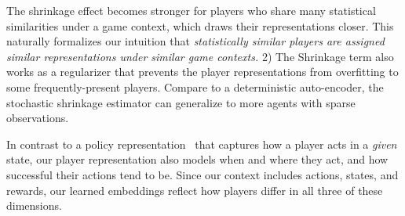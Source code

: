 \documentclass{article}
\newcommand{\latentvariables}{\mathbf{z}}
\newcommand{\state}{\mathbf{s}}
\newcommand{\action}{\mathbf{a}}
\newcommand{\reward}{\boldsymbol{r}}
\newcommand{\player}{pl}
\begin{document}
The shrinkage effect becomes stronger for players who share many statistical similarities under a game context, which %
draws their representations closer.
This naturally formalizes our intuition that {\em statistically similar players are assigned similar representations under similar game contexts.} 
2) The Shrinkage term also works as a regularizer that prevents the player representations from overfitting to some frequently-present players. Compare to a deterministic auto-encoder, the stochastic shrinkage estimator can generalize to more agents with sparse observations.

In contrast to a policy representation~\cite{GroverRepresent18,WhitneyACG20,ChandakAction19} that captures how a player acts in a {\em given} state, our player representation also models when and where they act, and how successful their actions tend to be. Since our context includes actions, states, and rewards, our learned embeddings reflect how players differ in all three of these dimensions. 


\end{document}
